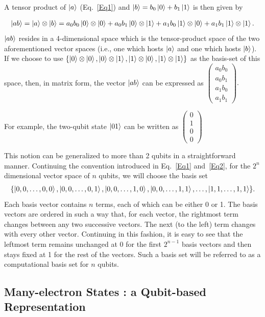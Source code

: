 \documentclass[12pt,oneside]{book}
\begin{document}
A tensor product of $\ket{a}$ (Eq.~\ref{Eq1}) and $\ket{b}=b_0\ket{0}+b_1\ket{1}$ is then given by

\begin{align}\label{Eq2}
    \ket{ab}=\ket{a}\otimes\ket{b}=a_0b_0 \ket{0}\otimes\ket{0} + a_0b_1 \ket{0}\otimes\ket{1} +a_1b_0 \ket{1}\otimes\ket{0} + a_1b_1\ket{1}\otimes\ket{1}.
\end{align}
$\ket{ab}$ resides in a 4-dimensional space which is the tensor-product space of the two aforementioned vector spaces (i.e., one which hosts $\ket{a}$ and one which hosts $\ket{b}$). If we choose to use $\{\ket{0}\otimes\ket{0} , \ket{0}\otimes\ket{1}, \ket{1}\otimes\ket{0}, \ket{1}\otimes\ket{1}\}$ as the basis-set of this space, then, in matrix form, the vector $\ket{ab}$ can be expressed as $\begin{pmatrix}
    a_0b_0\\
    a_0b_1\\
    a_1b_0\\
    a_1b_1
\end{pmatrix}.$

For example, the two-qubit state $\ket{01}$ can be written as $\begin{pmatrix}
    0\\
    1\\
    0\\
    0
\end{pmatrix}$

This notion can be generalized to more than 2 qubits in a straightforward manner. Continuing the convention introduced in Eq.~\ref{Eq1} and~\ref{Eq2}, for the $2^n$ dimensional vector space of $n$ qubits, we will choose the basis set
\begin{align*}
\{\ket{0,0,\hdots,0,0} , \ket{0,0,\hdots,0,1} , \ket{0,0,\hdots,1,0}, \ket{0,0,\hdots,1,1},\hdots ,\ket{1,1,\hdots,1,1} \}.
\end{align*}
Each basis vector contains $n$ terms, each of which can be either 0 or 1. The basis vectors are ordered in such a way that, for each vector, the rightmost term changes between any two successive vectors. The next (to the left) term changes with every other vector. Continuing in this fashion, it is easy to see that the leftmost term remains unchanged at 0 for the first $2^{n-1}$ basis vectors and then stays fixed at 1 for the rest of the vectors. Such a basis set will be referred to as a computational basis set for $n$ qubits.

\subsection*{Many-electron States : a Qubit-based Representation}
\end{document}
